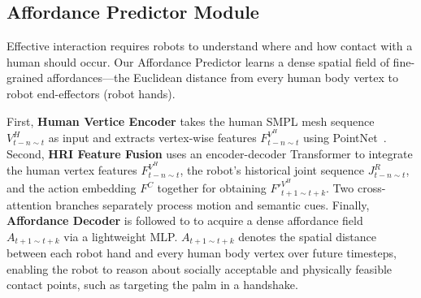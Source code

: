 
\subsection{Affordance Predictor Module}

Effective %
interaction requires robots to understand where and how contact with a human should occur. Our Affordance Predictor learns a dense spatial field of fine-grained affordances—the Euclidean distance from every human body vertex to robot end-effectors (robot hands).

First, \textbf{Human Vertice Encoder} takes the human SMPL mesh sequence $V^H_{t-n\sim t}$ as input and extracts vertex-wise features $F^{V^H}_{t-n \sim t}$ using PointNet~\cite{qi2017pointnet}.
Second, \textbf{HRI Feature Fusion} uses an encoder-decoder Transformer to integrate the human vertex features $F^{V^H}_{t-n \sim t}$, the robot's historical joint sequence $J^R_{t-n\sim t}$, and the action embedding $F^C$ together for obtaining $F'^{V^H}_{t+1\sim t+k}$. Two cross-attention branches separately process motion and semantic cues. Finally, \textbf{Affordance Decoder} is followed to to acquire a dense affordance field $A_{t+1\sim t+k}$ via a lightweight MLP. $A_{t+1\sim t+k}$ %
denotes the spatial distance between each robot hand and every human body vertex over future timesteps, enabling the robot to reason about socially acceptable and physically feasible contact points, such as targeting the palm in a handshake.


